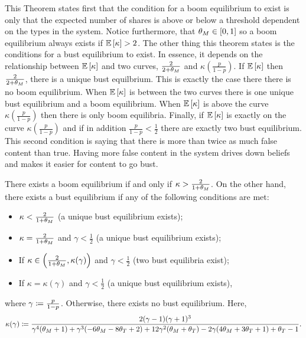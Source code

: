 This Theorem states first that the condition for a boom equilibrium to exist is only that the expected number of shares is above or below a threshold dependent on the types in the system. Notice furthermore, that $\theta_M \in [0,1]$ so a boom equilibrium always exists if $\mathbb{E}\left[ \kappa\right] > 2$. The other thing this theorem states is the conditions for a bust equilibrium to exist. In essence, it depends on the relationship between $\mathbb{E}\left[ \kappa\right]$ and two curves, $\frac{2}{2+\theta_M}$ and $\kappa(\frac{p}{1-p})$. If $\mathbb{E}\left[ \kappa\right] $ then $\frac{2}{2+\theta_M}$, there is a unique bust equilbrium. This is exactly the case there there is no boom equilibrium. When $\mathbb{E}\left[ \kappa\right]$ is between the two curves there is one unique bust equilibrium and a boom equilibrium. When $\mathbb{E}\left[ \kappa\right]$ is above the curve $\kappa(\frac{p}{1-p})$ then there is only boom equilibria. Finally, if $\mathbb{E}\left[ \kappa\right]$ is exactly  on the curve $\kappa(\frac{p}{1-p})$ and if in addition $\frac{p}{1-p} < \frac{1}{2}$ there are exactly two bust equilibrium. This second condition is saying that there is more than twice as much false content than true. Having more false content in the system drives down beliefs and makes it easier for content to go bust. 
\begin{theorem}\label{thm:equilibria-existence}
    There exists a  boom equilibrium if and only if $\kappa >  \frac{2}{1+\theta_M}$. On the other hand, there exists a bust equilibrium if any of the following conditions are met: 
    \begin{itemize}
        \item $\kappa < \frac{2}{1+\theta_M}$ (a unique bust equilibrium exists); 
        \item $\kappa = \frac{2}{1+\theta_M}$ and $\gamma < \frac{1}{2}$ (a unique bust equilibrium exists);  
        \item If $\kappa \in \left(\frac{2}{1+\theta_M} , \kappa(\gamma) \right)$ and $\gamma < \frac{1}{2}$ (two bust equilibria exist);
        \item If $\kappa = \kappa(\gamma)$ and $\gamma < \frac{1}{2}$ (a unique bust equilibrium exists),
    \end{itemize}
    where $\gamma \coloneqq \frac{p}{1-p}$. Otherwise, there exists no bust equilibrium. Here, \[\kappa(\gamma) \coloneqq \frac{2 (\gamma-1) (\gamma+1)^3}{\gamma^4 (\theta_M+1)+\gamma^3 (-6 \theta_M-8 \theta_T+2)+12 \gamma^2 (\theta_M+\theta_T)-2 \gamma (4 \theta_M+3 \theta_T+1)+\theta_T-1}.\]
\end{theorem}


